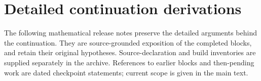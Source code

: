 \clearpage\appendix
\section{Detailed continuation derivations}\label{app:continuation}
The following mathematical release notes preserve the detailed arguments
behind the continuation. They are source-grounded exposition of the completed
blocks, and retain their original hypotheses. Source-declaration and build
inventories are supplied separately in the archive. References to earlier
blocks and then-pending work are dated checkpoint statements; current scope
is given in the main text.











